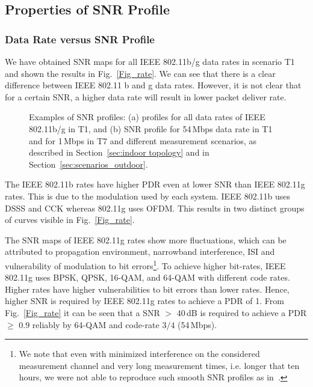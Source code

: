 \documentclass[11pt,draftclsnofoot,journal,onecolumn]{IEEEtran}
\begin{document}
\subsection{Properties of SNR Profile}
\label{sec:lqe_evaluation}

\subsubsection{Data Rate versus SNR Profile}

We have obtained SNR maps for all IEEE 802.11b/g data rates in scenario T1 and shown the results in Fig.~\ref{Fig_rate}. We can see that there is a clear difference between IEEE 802.11 b and g data rates. However, it is not clear that for a certain SNR, a higher data rate will result in lower packet deliver rate.
\begin{figure}
\centering
{}
\caption{Examples of SNR profiles: (a) profiles for all data rates of IEEE 802.11b/g in T1, and (b) SNR profile for 54\,Mbps data rate in T1 and for 1\,Mbps in T7 and different measurement scenarios, as described in Section~\ref{sec:indoor topology} and in Section~\ref{sec:scenarios_outdoor}.}
\end{figure}

The IEEE 802.11b rates have higher PDR even at lower SNR than IEEE 802.11g rates. This is due to the modulation used by each system. IEEE 802.11b uses DSSS and CCK whereas 802.11g uses OFDM. This results in two distinct groups of curves visible in Fig.~\ref{Fig_rate}.

The SNR maps of IEEE 802.11g rates show more fluctuations, which can be attributed to propagation environment, narrowband interference, ISI and vulnerability of modulation to bit errors\footnote{We note that even with minimized interference on the considered measurement channel and very long measurement times, i.e. longer that ten hours, we were not able to reproduce such smooth SNR profiles as in~\cite[Fig. 2, Fig. 5]{Zhang_Infocom_2008}.}. To achieve higher bit-rates, IEEE 802.11g uses BPSK, QPSK, 16-QAM, and 64-QAM with different code rates. Higher rates have higher vulnerabilities to bit errors than lower rates. Hence, higher SNR is required by IEEE 802.11g rates to achieve a PDR of 1. From Fig.~\ref{Fig_rate} it can be seen that a SNR $>$ 40\,dB is required to achieve a PDR $\geq$ 0.9 reliably by 64-QAM and code-rate $3/4$ (54\,Mbps).
\end{document}
